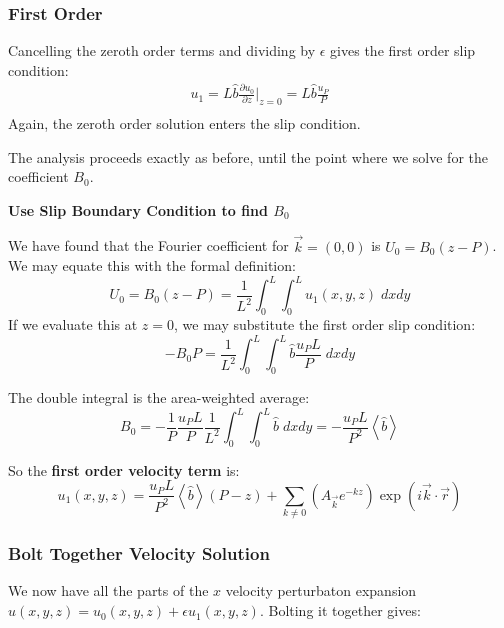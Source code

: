 \documentclass[12pt, a4paper, twoside, openright]{book}
\begin{document}
\subsubsection*{First Order}
Cancelling the zeroth order terms and dividing by $\epsilon$ gives the first order slip condition:
\begin{gather}
u_1 = L \hat{b} \frac{\partial u_0}{\partial z} \rvert_{z=0}
= L \hat{b} \frac{u_P}{P} \\
\end{gather}
Again, the zeroth order solution enters the slip condition.

\vspace{1em}
The analysis proceeds exactly as before, until the point where we solve for the coefficient $B_0$.
\vspace{1em}

\textbf{Use Slip Boundary Condition to find $B_0$}

We have found that the Fourier coefficient for $\vec{k} = (0,0)$ is $U_0 = B_0 (z - P)$.
We may equate this with the formal definition:
\begin{equation}
U_0 = B_0 (z - P) = \frac{1}{L^2} \int_0^L \int_0^L u_1(x,y,z) \;dxdy
\end{equation}
If we evaluate this at $z=0$, we may substitute the first order slip condition:
\begin{equation}
- B_0 P = \frac{1}{L^2} \int_0^L \int_0^L \hat{b} \frac{u_P L}{P} \;dxdy
\end{equation}

The double integral is the area-weighted average:
\begin{equation}
B_0 = - \frac{1}{P} \frac{u_P L}{P} \frac{1}{L^2} \int_0^L \int_0^L \hat{b} \;dxdy
= - \frac{u_P L}{P^2} \left< \hat{b} \right>
\end{equation}

\vspace{1em}
So the \textbf{first order velocity term} is:
\begin{equation}
u_1(x,y,z) =  \frac{u_P L}{P^2} \left< \hat{b} \right> (P - z)
 + \sum_{k \neq 0} 
\left(  A_{\vec{k}} e^{-kz} \right)
\exp(i \vec{k}\cdot \vec{r})
\end{equation}

\subsubsection*{Bolt Together Velocity Solution}
We now have all the parts of the $x$ velocity perturbaton expansion $u(x,y,z) = u_0(x,y,z) + \epsilon u_1(x,y,z)$.  Bolting it together gives:
\end{document}
